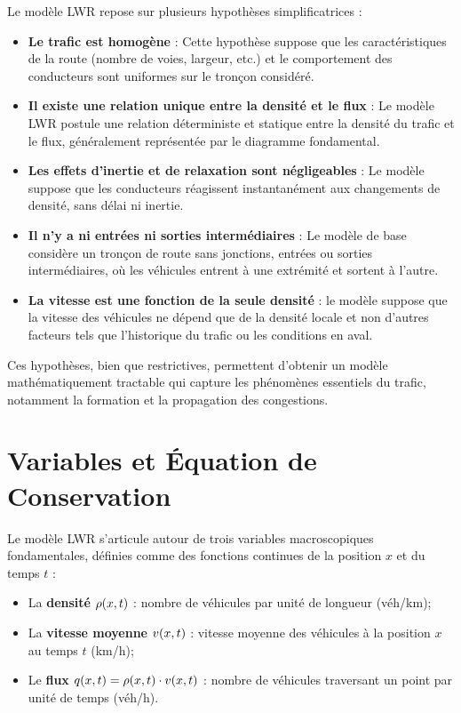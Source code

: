    Le modèle LWR repose sur plusieurs hypothèses simplificatrices :
    
    \begin{itemize}
        \item \textbf{Le trafic est homogène} : Cette hypothèse suppose que les caractéristiques de la route (nombre de voies, largeur, etc.) et le comportement des conducteurs sont uniformes sur le tronçon considéré.
        \item \textbf{Il existe une relation unique entre la densité et le flux} : Le modèle LWR postule une relation déterministe et statique entre la densité du trafic et le flux, généralement représentée par le diagramme fondamental.
        \item \textbf{Les effets d'inertie et de relaxation sont négligeables} : Le modèle suppose que les conducteurs réagissent instantanément aux changements de densité, sans délai ni inertie.
        \item \textbf{Il n'y a ni entrées ni sorties intermédiaires} : Le modèle de base considère un tronçon de route sans jonctions, entrées ou sorties intermédiaires, où les véhicules entrent à une extrémité et sortent à l'autre.
        \item \textbf{La vitesse est une fonction de la seule densité} : le modèle suppose que la vitesse des véhicules ne dépend que de la densité locale et non d'autres facteurs tels que l'historique du trafic ou les conditions en aval.
    \end{itemize}

Ces hypothèses, bien que restrictives, permettent d'obtenir un modèle mathématiquement tractable qui capture les phénomènes essentiels du trafic, notamment la formation et la propagation des congestions.

\section{Variables et Équation de Conservation}
\label{sec:equation_conservation}

Le modèle LWR s'articule autour de trois variables macroscopiques fondamentales, définies comme des fonctions continues de la position $x$ et du temps $t$ :

\begin{definition}
\begin{itemize}
\item La \textbf{densité} $\rho(x,t)$ : nombre de véhicules par unité de longueur (véh/km);
\item La \textbf{vitesse moyenne} $v(x,t)$ : vitesse moyenne des véhicules à la position $x$ au temps $t$ (km/h);
\item Le \textbf{flux} $q(x,t) = \rho(x,t) \cdot v(x,t)$ : nombre de véhicules traversant un point par unité de temps (véh/h).
\end{itemize}
\end{definition}

